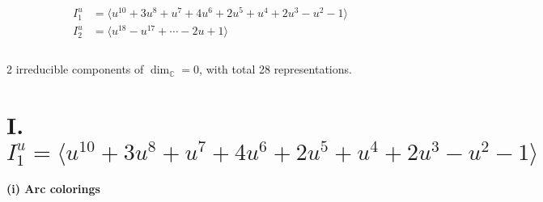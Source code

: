 \documentclass[1p]{elsarticle_modified}
\theoremstyle{definition}
\begin{document}
\begin{align*}
I^u_{1}&=\langle 
u^{10}+3 u^8+u^7+4 u^6+2 u^5+u^4+2 u^3- u^2-1\rangle \\
I^u_{2}&=\langle 
u^{18}- u^{17}+\cdots-2 u+1\rangle \\
\\
\end{align*}
\raggedright * 2 irreducible components of $\dim_{\mathbb{C}}=0$, with total 28 representations.\\
\newpage
\renewcommand{\arraystretch}{1}
\centering \section*{I. $I^u_{1}= \langle u^{10}+3 u^8+u^7+4 u^6+2 u^5+u^4+2 u^3- u^2-1 \rangle$}
\flushleft \textbf{(i) Arc colorings}\\
\end{document}
